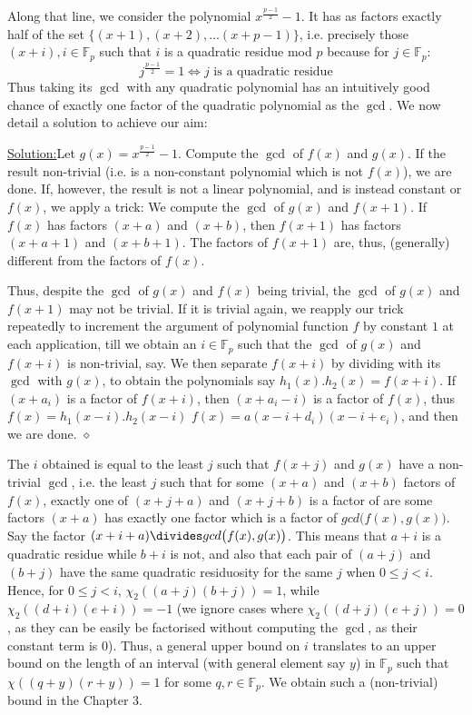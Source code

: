 \documentclass{report}
\newenvironment{aimsol}[1]{\vspace{2.5mm}\par\noindent\underline{Solution:}\space#1}{\hfill $\diamond$ \vspace{2.5mm} \par}
\begin{document}
Along that line, we consider the polynomial $x^{\frac{p-1}{2}}-1$. It has as factors exactly half of the set $\{(x+1),(x+2),...(x+p-1)\}$, i.e. precisely those $(x+i), i\in \mathbb{F}_p$ such that $i$ is a quadratic residue mod $p$ because for $j\in\mathbb{F}_p$:
$$j^{\frac{p-1}{2}}=1 \Leftrightarrow j\text{ is a quadratic residue}$$
Thus taking its $\gcd$ with any quadratic polynomial has an intuitively good chance of exactly one factor of the quadratic polynomial as the $\gcd$. We now detail a solution to achieve our aim:
\begin{aimsol}
Let $g(x)=x^{\frac{p-1}{2}}-1$. Compute the $\gcd$ of $f(x)$ and $g(x)$. If the result non-trivial (i.e. is a non-constant polynomial which is not $f(x)$), we are done. If, however, the result is not a linear polynomial, and is instead constant or $f(x)$, we apply a trick: We compute the $\gcd$ of $g(x)$ and $f(x+1)$. If $f(x)$ has factors $(x+a)$ and $(x+b)$, then $f(x+1)$ has factors $(x+a+1)$ and $(x+b+1)$. The factors of $f(x+1)$ are, thus, (generally) different from the factors of $f(x)$.

Thus, despite the $\gcd$ of $g(x)$ and $f(x)$ being trivial, the $\gcd$ of $g(x)$ and $f(x+1)$ may not be trivial. If it is trivial again, we reapply our trick repeatedly to increment the argument of polynomial function $f$ by constant $1$ at each application, till we obtain an $i\in\mathbb{F}_p$ such that the $\gcd$ of $g(x)$ and $f(x+i)$ is non-trivial, say. We then separate $f(x+i)$ by dividing with its $\gcd$ with $g(x)$, to obtain the polynomials say $h_1(x).h_2(x)=f(x+i)$. If $(x+a_i)$ is a factor of $f(x+i)$, then $(x+a_i-i)$ is a factor of $f(x)$, thus $f(x)=h_1(x-i).h_2(x-i)$ $f(x)=a(x-i+d_i)(x-i+e_i)$, and then we are done.
\end{aimsol}
%

The $i$ obtained is equal to the least $j$ such that $f(x+j)$ and $g(x)$ have a non-trivial $\gcd$, i.e. the least $j$ such that for some $(x+a)$ and $(x+b)$ factors of $f(x)$, exactly one of $(x+j+a)$ and $(x+j+b)$ is a factor of
are some factors $(x+a)$ has exactly one factor which is a factor of $gcd\big(f(x),g(x)\big)$. Say the factor $(x+i+a)\divides gcd\big(f(x),g(x)\big)$. This means that $a+i$ is a quadratic residue while $b+i$ is not, and also that each pair of $(a+j)$ and $(b+j)$ have the same quadratic residuosity for the same $j$ when $0\leq j<i$. Hence, for $0\leq j<i$, $\chi_2((a+j)(b+j))=1$, while $\chi_2((d+i)(e+i))=-1$ (we ignore cases where $\chi_2((d+j)(e+j))=0$, as they can be easily be factorised without computing the $\gcd$, as their constant term is $0$). Thus, a general upper bound on $i$ translates to an upper bound on the length of an interval (with general element say $y$) in $\mathbb{F}_p$ such that $\chi((q+y)(r+y))=1$ for some $q,r\in \mathbb{F}_p$. We obtain such a (non-trivial) bound in the Chapter 3.
\end{document}
